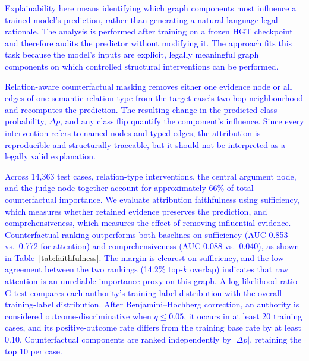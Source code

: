 \documentclass[runningheads]{llncs}
\begin{document}
\textcolor{blue}{Explainability here means identifying which graph components most influence
a trained model's prediction, rather than generating a natural-language
legal rationale. The analysis is performed after training on a frozen HGT
checkpoint and therefore audits the predictor without modifying it. The approach fits this task because the model's inputs are explicit,
legally meaningful graph components on which controlled structural
interventions can be performed.}

\textcolor{blue}{Relation-aware counterfactual masking removes either one evidence node or
all edges of one semantic relation type from the target case's two-hop
neighbourhood and recomputes the prediction. The resulting change in the
predicted-class probability, $\Delta p$, and any class flip quantify the
component's influence. Since every intervention refers to named nodes and
typed edges, the attribution is reproducible and structurally traceable,
but it should not be interpreted as a legally valid explanation.}

\textcolor{blue}{Across 14,363 test cases, relation-type interventions, the central argument
node, and the judge node together account for approximately 66\% of total
counterfactual importance. We evaluate attribution faithfulness using
sufficiency, which measures whether retained evidence preserves the prediction,
and comprehensiveness, which measures the effect of removing influential
evidence. Counterfactual ranking outperforms both baselines on sufficiency
(AUC 0.853 vs.\ 0.772 for attention) and comprehensiveness
(AUC 0.088 vs.\ 0.040), as shown in Table~\ref{tab:faithfulness}.
The margin is clearest on sufficiency, and the low agreement between
the two rankings (14.2\% top-$k$ overlap) indicates that raw attention
is an unreliable importance proxy on this graph. A log-likelihood-ratio G-test compares each authority's training-label distribution with the overall training-label distribution. After Benjamini--Hochberg correction, an authority is considered outcome-discriminative when $q\leq0.05$, it occurs in at least 20 training cases, and its positive-outcome rate differs from the training base rate by at least 0.10. Counterfactual components are ranked independently by $|\Delta p|$, retaining the top 10 per case.}
\end{document}
